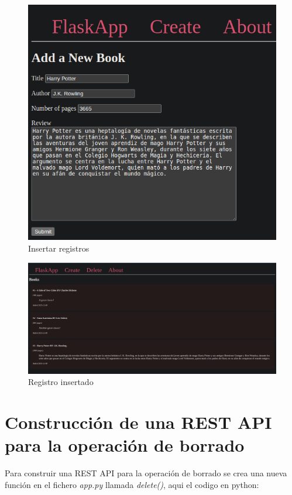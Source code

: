 \documentclass[11pt]{report}
\begin{document}
\begin{figure}[H]
  \centering
  \includegraphics[scale=0.45]{img/create_book.png}
  \caption{Insertar registros}
\end{figure}

\begin{figure}[H]
  \centering
  \includegraphics[scale=0.23]{img/added_book.png}
  \caption{Registro insertado}
\end{figure}

\cleardoublepage

\section{Construcción de una REST API para la operación de borrado}
Para construir una REST API para la operación de borrado se crea una nueva función en el fichero \emph{app.py}
llamada \emph{delete()}, aqui el codigo en python:
\lstset{style=mystyle}

\end{document}

